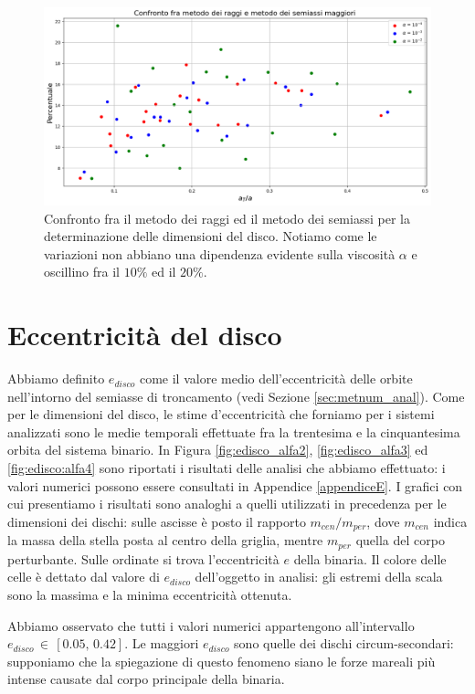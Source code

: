 \begin{figure}[H]
  \centering
  \includegraphics[width=\textwidth]{Immagini/Risultati/discr_disc.png}
  \caption{Confronto fra il metodo dei raggi ed il metodo dei semiassi per la determinazione delle dimensioni del disco. Notiamo come le variazioni non abbiano una dipendenza evidente sulla viscosità $\alpha$ e oscillino fra il $10\%$ ed il $20\%$.}
  \label{fig:discr_disc}
\end{figure}

\section{Eccentricità del disco} \label{sec:ecc_disc}

Abbiamo definito $e_{disco}$ come il valore medio dell'eccentricità delle orbite nell'intorno del semiasse di troncamento (vedi Sezione \ref{sec:metnum_anal}). Come per le dimensioni del disco, le stime d'eccentricità che forniamo per i sistemi analizzati sono le medie temporali effettuate fra la trentesima e la cinquantesima orbita del sistema binario.
In Figura \ref{fig:edisco_alfa2}, \ref{fig:edisco_alfa3} ed \ref{fig:edisco:alfa4} sono riportati i risultati delle analisi che abbiamo effettuato: i valori numerici possono essere consultati in Appendice \ref{appendiceE}.
I grafici con cui presentiamo i risultati sono analoghi a quelli utilizzati in precedenza per le dimensioni dei dischi: sulle ascisse è posto il rapporto $m_{cen}/m_{per}$, dove $m_{cen}$ indica la massa della stella posta al centro della griglia, mentre $m_{per}$ quella del corpo perturbante. Sulle ordinate si trova l'eccentricità $e$ della binaria. 
Il colore delle celle è dettato dal valore di $e_{disco}$ dell'oggetto in analisi: gli estremi della scala sono la massima e la minima eccentricità ottenuta.

Abbiamo osservato che tutti i valori numerici appartengono all'intervallo $e_{disco}\,\in\,[0.05,\,0.42]$.
Le maggiori $e_{disco}$ sono quelle dei dischi circum-secondari: supponiamo che la spiegazione di questo fenomeno siano le forze mareali più intense causate dal corpo principale della binaria.

